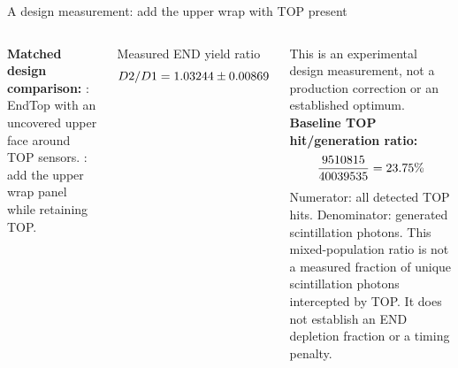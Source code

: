 \begin{frame}{A design measurement: add the upper wrap with TOP present}
\begin{columns}[T]
\column{\HalfWidth}
\textbf{Matched design comparison:}\newline
\IdDOne: EndTop with an uncovered upper face around TOP sensors.\newline
\IdDTwo: add the upper wrap panel while retaining TOP.
\begin{block}{Measured END yield ratio}
\[D2/D1=1.03244\pm0.00869\]
\end{block}
This is an experimental design measurement, not a production correction or an established optimum.
\column{\HalfWidth}
\textbf{Baseline TOP hit/generation ratio:}
\[\frac{9510815}{40039535}=23.75\%\]
Numerator: all detected TOP hits.\newline
Denominator: generated scintillation photons.
\vspace{\Gap}
\alert{This mixed-population ratio is not a measured fraction of unique scintillation photons intercepted by TOP.} It does not establish an END depletion fraction or a timing penalty.
\end{columns}
\end{frame}
